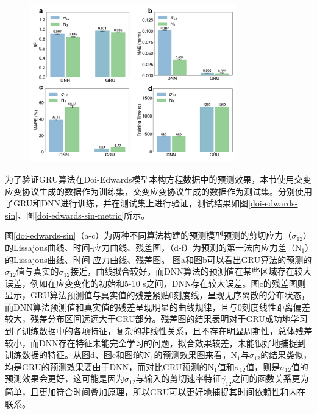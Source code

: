 \begin{figure}[htbp]
  \centering
  \includegraphics[width=0.8\textwidth]{Fig/doi-edwards-sin-metrics.pdf}
\end{figure}
为了验证GRU算法在Doi-Edwards模型本构方程数据中的预测效果，本节使用交变应变协议生成的数据作为训练集，交变应变协议生成的数据作为测试集。分别使用了GRU和DNN进行训练，并在测试集上进行验证，测试结果如图\ref{doi-edwards-sin}、图\ref{doi-edwards-sin-metric}所示。

图\ref{doi-edwards-sin}（a-c）为两种不同算法构建的预测模型预测的剪切应力（$\sigma_{12}$）的Lissajous曲线、时间-应力曲线、残差图，（d-f）为预测的第一法向应力差（N$_{1}$）的Lissajous曲线、时间-应力曲线、残差图。
图a和图b可以看出GRU算法的预测的$\sigma_{12}$值与真实的$\sigma_{12}$接近，曲线拟合较好。而DNN算法的预测值在某些区域存在较大误差，例如在应变变化的初始和5-10 s之间，DNN存在较大误差。图c的残差图则显示，GRU算法预测值与真实值的残差紧贴0刻度线，呈现无序离散的分布状态，而DNN算法预测值和真实值的残差呈现明显的曲线规律，且与0刻度线性距离偏差较大，残差分布区间远远大于GRU部分。残差图的结果表明对于GRU成功地学习到了训练数据中的各项特征，复杂的非线性关系，且不存在明显周期性，总体残差较小，而DNN存在特征未能完全学习的问题，拟合效果较差，未能很好地捕捉到训练数据的特征。从图d、图e和图f的N$_1$的预测效果图来看，N$_1$与$\sigma_{12}$的结果类似，均是GRU的预测效果要由于DNN，而对比GRU预测的N$_1$值和$\sigma_{12}$值，则是$\sigma_{12}$值的预测效果会更好，这可能是因为$\sigma_{12}$与输入的剪切速率特征$\dot{\gamma_{12}}$之间的函数关系更为简单，且更加符合时间叠加原理，所以GRU可以更好地捕捉其时间依赖性和内在联系。


